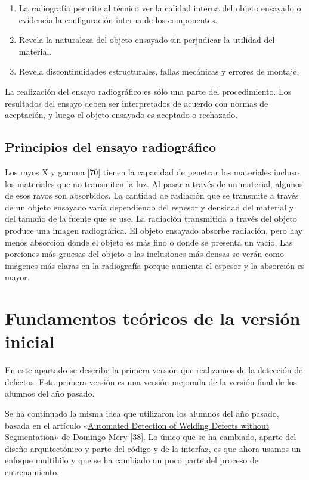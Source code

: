 \begin{enumerate}
\item La radiografía permite al técnico ver la calidad interna del objeto ensayado o evidencia la
configuración interna de los componentes.
\item Revela la naturaleza del objeto ensayado sin perjudicar la utilidad del material.
\item Revela discontinuidades estructurales, fallas mecánicas y errores de montaje.
\end{enumerate}

La realización del ensayo radiográfico es sólo una parte del procedimiento. Los resultados del ensayo deben ser interpretados de acuerdo con normas de aceptación, y luego el objeto ensayado es aceptado o rechazado.

\subsection{Principios del ensayo radiográfico}
Los rayos X y gamma [70] tienen la capacidad de penetrar los materiales incluso los materiales que no transmiten la luz. Al pasar a través de un material, algunos de esos rayos son absorbidos. La cantidad de radiación que se transmite a través de un objeto ensayado varía dependiendo del espesor y densidad del material y del tamaño de la fuente que se use. La radiación transmitida a través del objeto produce una imagen radiográfica. El objeto ensayado absorbe radiación, pero hay menos absorción donde el objeto es más fino o donde se presenta un vacío. Las porciones más gruesas del objeto o las inclusiones más densas se verán como imágenes más claras en la radiografía porque aumenta el espesor y la absorción es mayor.


\section{Fundamentos teóricos de la versión inicial}
En este apartado se describe la primera versión que realizamos de la detección de defectos. Esta primera versión es una versión mejorada de la versión final de los alumnos del año pasado.

Se ha continuado la misma idea que utilizaron los alumnos del año pasado, basada en el artículo «\underline{Automated Detection of Welding Defects without Segmentation}» de Domingo Mery [38]. Lo único que se ha cambiado, aparte del diseño arquitectónico y parte del código y de la interfaz, es que ahora usamos un enfoque multihilo y que se ha cambiado un poco parte del proceso de entrenamiento.

